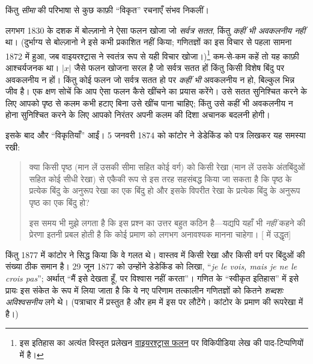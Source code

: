 \documentclass[../../../include/open-logic-section]{subfiles}
\begin{document}

किंतु \emph{सीमा} की परिभाषा से कुछ काफ़ी ``विकृत'' रचनाएँ संभव निकलीं।

लगभग 1830 के दशक में बोल्ज़ानो ने ऐसा फलन खोजा जो \emph{सर्वत्र सतत}, किंतु
\emph{कहीं भी अवकलनीय नहीं} था। (दुर्भाग्य से बोल्ज़ानो ने इसे कभी प्रकाशित
नहीं किया; गणितज्ञों का इस विचार से पहला सामना 1872 में हुआ, जब
वाइयरश्ट्रास ने स्वतंत्र रूप से यही विचार खोजा।)\footnote{इस इतिहास का अत्यंत
विस्तृत प्रलेखन \href{http://en.wikipedia.org/wiki/Weierstrass_function}{वाइयरश्ट्रास
फलन} पर विकिपीडिया लेख की पाद-टिप्पणियों में है।} कम-से-कम कहें तो यह काफ़ी
आश्चर्यजनक था। $|x|$ जैसे फलन खोजना सरल है जो सर्वत्र सतत हों किंतु किसी
विशेष बिंदु पर अवकलनीय न हों। किंतु कोई फलन जो सर्वत्र सतत हो पर \emph{कहीं
भी} अवकलनीय न हो, बिल्कुल भिन्न जीव है। एक क्षण सोचें कि आप ऐसा फलन कैसे
खींचने का प्रयास करेंगे। उसे सतत सुनिश्चित करने के लिए आपको पृष्ठ से कलम
कभी हटाए बिना उसे खींच पाना चाहिए; किंतु उसे कहीं भी अवकलनीय न होना सुनिश्चित
करने के लिए आपको निरंतर अपनी कलम की दिशा अचानक बदलनी होगी।

इसके बाद और ``विकृतियाँ'' आईं। 5 जनवरी 1874 को कांटोर ने डेडेकिंड को पत्र
लिखकर यह समस्या रखी:
\begin{quote}
क्या किसी पृष्ठ (मान लें उसकी सीमा सहित कोई वर्ग) को किसी रेखा (मान लें उसके
अंतबिंदुओं सहित कोई सीधी रेखा) से एकैकी रूप से इस तरह सहसंबद्ध किया जा सकता
है कि पृष्ठ के प्रत्येक बिंदु के अनुरूप रेखा का एक बिंदु हो और इसके विपरीत
रेखा के प्रत्येक बिंदु के अनुरूप पृष्ठ का एक बिंदु हो?

इस समय भी मुझे लगता है कि इस प्रश्न का उत्तर बहुत कठिन है---यद्यपि यहाँ भी
\emph{नहीं} कहने की प्रेरणा इतनी प्रबल होती है कि कोई प्रमाण को लगभग अनावश्यक
मानना चाहेगा। [\citealt{Gouvea2011} में उद्धृत]
\end{quote}
किंतु 1877 में कांटोर ने सिद्ध किया कि वे गलत थे। वास्तव में किसी रेखा और
किसी वर्ग पर बिंदुओं की संख्या ठीक समान है। 29 जून 1877 को उन्होंने डेडेकिंड
को लिखा, ``\emph{je le vois, mais je ne le crois pas}''; अर्थात् ``मैं इसे
देखता हूँ, पर विश्वास नहीं करता''। गणित के ``स्वीकृत इतिहास'' में इसे प्रायः
इस संकेत के रूप में लिया जाता है कि ये नए परिणाम तत्कालीन गणितज्ञों को कितने
\emph{शब्दशः अविश्वसनीय} लगे थे। (पत्राचार \citet{Gouvea2011} में प्रस्तुत
है और हम  में इस पर लौटेंगे। कांटोर के प्रमाण
की रूपरेखा  में है।)
\end{document}

